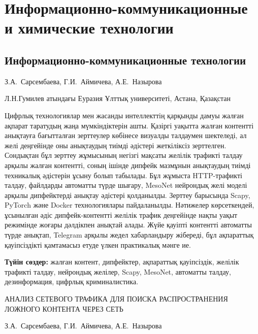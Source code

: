 \let\cleardoublepage\clearpage
\part{Информационно-коммуникационные и химические технологии}
\chapter{Информационно-коммуникационные технологии}
\vspace{1em}
\begin{header}

З.А.~Сарсембаева\envelope,
Г.И.~Аймичева,
А.Е.~Назырова
\end{header}

\begin{affil}
Л.Н.Гумилев атындағы Еуразия Ұлттық университеті, Астана, Қазақстан

\end{affil}

Цифрлық технологиялар мен жасанды интеллекттің қарқынды дамуы жалған
ақпарат таратудың жаңа мүмкіндіктерін ашты. Қазіргі уақытта жалған
контентті анықтауға бағытталған зерттеулер көбінесе визуалды талдаумен
шектеледі, ал желі деңгейінде оны анықтаудың тиімді әдістері жеткіліксіз
зерттелген. Сондықтан бұл зерттеу жұмысының негізгі мақсаты желілік
трафикті талдау арқылы жалған контентті, соның ішінде дипфейк мазмұнын
анықтаудың тиімді техникалық әдістерін ұсыну болып табылады. Бұл жұмыста
HTTP-трафикті талдау, файлдарды автоматты түрде шығару, MesoNet
нейрондық желі моделі арқылы дипфейктерді анықтау әдістері қолданылды.
Зерттеу барысында Scapy, PyTorch және Docker технологиялары
пайдаланылды. Нәтижелер көрсеткендей, ұсынылған әдіс дипфейк-контентті
желілік трафик деңгейінде нақты уақыт режимінде жоғары дәлдікпен анықтай
алады. Жүйе қауіпті контентті автоматты түрде анықтап, Telegram арқылы
жедел хабарландыру жібереді, бұл ақпараттық қауіпсіздікті қамтамасыз
етуде үлкен практикалық мәнге ие.

{\bfseries Түйін сөздер:} жалған контент, дипфейктер, ақпараттық
қауіпсіздік, желілік трафикті талдау, нейрондық желілер, Scapy, MesoNet,
автоматты талдау, дезинформация, цифрлық криминалистика.
\vspace{1em}
\begin{header}
АНАЛИЗ СЕТЕВОГО ТРАФИКА ДЛЯ ПОИСКА РАСПРОСТРАНЕНИЯ ЛОЖНОГО КОНТЕНТА ЧЕРЕЗ СЕТЬ

З.А.~Сарсембаева\envelope,
Г.И.~Аймичева,
А.Е.~Назырова
\end{header}

